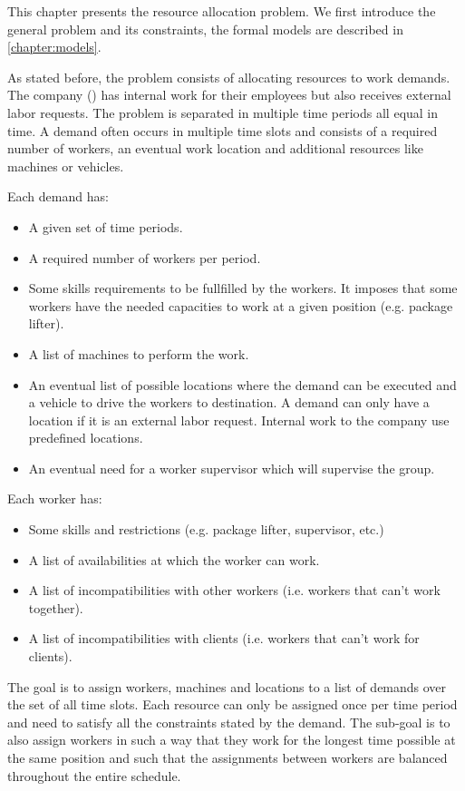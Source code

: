 \documentclass[../thesis.tex]{subfiles}
\begin{document}
This chapter presents the resource allocation problem.
We first introduce the general problem and its constraints, 
the formal models are described in \autoref{chapter:models}.

As stated before, the problem consists of allocating resources to work demands. 
The company (\vone) has internal work for their employees but also receives 
external labor requests. The problem is separated in multiple time periods all equal in time.
A demand often occurs in multiple time slots and consists of a required number of workers, an eventual 
work location and additional resources like machines or vehicles.

Each demand has:

\begin{itemize}
  \item A given set of time periods.
  \item A required number of workers per period.
  \item Some skills requirements to be fullfilled by the workers. 
  It imposes that some workers have the needed capacities to work at a given position (e.g. package lifter).
  \item A list of machines to perform the work.
  \item An eventual list of possible locations where the demand can be executed and a vehicle to drive the workers to destination.
  A demand can only have a location if it is an external labor request. Internal work to the company use predefined locations.
  \item An eventual need for a worker supervisor which will supervise the group.
\end{itemize}


Each worker has:

\begin{itemize}
  \item Some skills and restrictions (e.g. package lifter, supervisor, etc.)
  \item A list of availabilities at which the worker can work.
  \item A list of incompatibilities with other workers (i.e. workers that can't work together).
  \item A list of incompatibilities with clients (i.e. workers that can't work for clients).
\end{itemize}

The goal is to assign workers, machines and locations to a list of demands over the set of all time slots.
Each resource can only be assigned once per time period and need to satisfy all the constraints stated by the demand. 
The sub-goal is to also assign workers in such a way that they work for the longest time possible at the same position and 
 such that the assignments between workers are balanced throughout the entire schedule.
\end{document}
